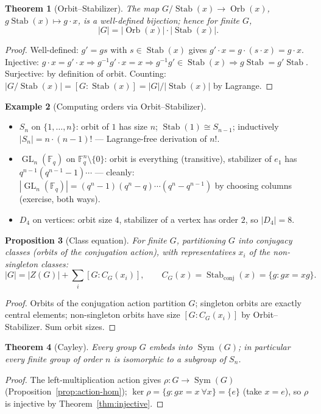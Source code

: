 \documentclass[11pt,a4paper]{article}
\newtheorem{theorem}{Theorem}[section]
\newtheorem{proposition}[theorem]{Proposition}
\theoremstyle{definition}
\newtheorem{example}[theorem]{Example}
\newcommand{\F}{\mathbb{F}}
\newcommand{\GL}{\operatorname{GL}}
\newcommand{\Sym}{\operatorname{Sym}}
\newcommand{\Orb}{\operatorname{Orb}}
\newcommand{\Stab}{\operatorname{Stab}}
\begin{document}
	\begin{theorem}[Orbit--Stabilizer]\label{thm:orbit-stabilizer}
		The map $G/\Stab(x)\to\Orb(x)$, $g\Stab(x)\mapsto g\cdot x$, is a well-defined bijection; hence for
		finite $G$,
		\[
		|G|=|\Orb(x)|\cdot|\Stab(x)|.
		\]
	\end{theorem}
	\begin{proof}
		Well-defined: $g'=gs$ with $s\in\Stab(x)$ gives $g'\cdot x=g\cdot(s\cdot x)=g\cdot x$. Injective:
		$g\cdot x=g'\cdot x\Rightarrow g^{-1}g'\cdot x=x\Rightarrow g^{-1}g'\in\Stab(x)\Rightarrow g\Stab=g'\Stab$.
		Surjective: by definition of orbit. Counting: $|G/\Stab(x)|=[G:\Stab(x)]=|G|/|\Stab(x)|$ by Lagrange.
	\end{proof}
	
	\begin{example}[Computing orders via Orbit--Stabilizer]
		\begin{itemize}
			\item $S_n$ on $\{1,\dots,n\}$: orbit of $1$ has size $n$; $\Stab(1)\cong S_{n-1}$; inductively
			$|S_n|=n\cdot(n-1)!$ --- Lagrange-free derivation of $n!$.
			\item $\GL_n(\F_q)$ on $\F_q^n\setminus\{0\}$: orbit is everything (transitive), stabilizer of $e_1$
			has $q^{n-1}(q^{n-1}-1)\cdots$ --- cleanly: $|\GL_n(\F_q)|=(q^n-1)(q^n-q)\cdots(q^n-q^{n-1})$ by
			choosing columns (exercise, both ways).
			\item $D_4$ on vertices: orbit size $4$, stabilizer of a vertex has order $2$, so $|D_4|=8$.
		\end{itemize}
	\end{example}
	
	\begin{proposition}[Class equation]\label{prop:class-equation}
		For finite $G$, partitioning $G$ into conjugacy classes (orbits of the conjugation action), with
		representatives $x_i$ of the non-singleton classes:
		\[
		|G|=|Z(G)|+\sum_i [G:C_G(x_i)],\qquad C_G(x)=\Stab_{\text{conj}}(x)=\{g:gx=xg\}.
		\]
	\end{proposition}
	\begin{proof}
		Orbits of the conjugation action partition $G$; singleton orbits are exactly central elements;
		non-singleton orbits have size $[G:C_G(x_i)]$ by Orbit--Stabilizer. Sum orbit sizes.
	\end{proof}
	
	\begin{theorem}[Cayley]\label{thm:cayley}
		Every group $G$ embeds into $\Sym(G)$; in particular every finite group of order $n$ is isomorphic to
		a subgroup of $S_n$.
	\end{theorem}
	\begin{proof}
		The left-multiplication action gives $\rho:G\to\Sym(G)$ (Proposition~\ref{prop:action-hom});
		$\ker\rho=\{g:gx=x\ \forall x\}=\{e\}$ (take $x=e$), so $\rho$ is injective by
		Theorem~\ref{thm:injective}.
	\end{proof}
	
\end{document}
